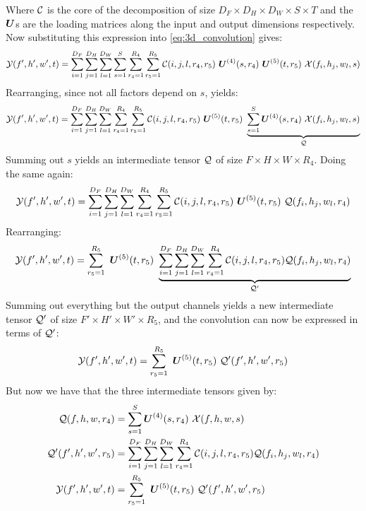 Where $\mathcal{C}$ is the core of the decomposition of size $D_F\times D_H \times D_W \times S \times T$ and the $\boldsymbol{U}$s are the loading matrices along the input and output dimensions respectively. Now substituting this expression into \eqref{eq:3d_convolution} gives:
\begin{equation}
    \tensor{Y}(f', h', w', t) = \sum_{i=1}^{D_F} \sum_{j=1}^{D_H} \sum_{l=1}^{D_W} \sum_{s=1}^{S} \sum_{r_{4}=1}^{R_{4}} \sum_{r_{5}=1}^{R_{5}} \tensor{C}(i, j, l, r_{4}, r_{5}) \ \boldsymbol{U}^{(4)}(s, r_{4}) \  \boldsymbol{U}^{(5)}(t, r_{5}) \ \tensor{X}(f_i, h_j, w_l, s)
\end{equation}
Rearranging, since not all factors depend on $s$, yields:
\begin{equation}
    \mathcal{Y}(f', h', w', t) = \sum_{i=1}^{D_F} \sum_{j=1}^{D_H} \sum_{l=1}^{D_W} \sum_{r_{4}=1}^{R_{4}} \sum_{r_{5}=1}^{R_{5}} \mathcal{C}(i, j, l, r_{4}, r_{5}) \ \boldsymbol{U}^{(5)}(t, r_{5}) \ \underbrace{\sum_{s=1}^{S} \boldsymbol{U}^{(4)}(s, r_{4}) \ \mathcal{X}(f_i, h_j, w_l, s)}_{\large \mathcal{Q}}
\end{equation}
Summing out $s$ yields an intermediate tensor $\mathcal{Q}$ of size $F\times H \times W \times R_4$. Doing the same again:
\begin{equation}
    \mathcal{Y}(f', h', w', t) = \sum_{i=1}^{D_F} \sum_{j=1}^{D_H} \sum_{l=1}^{D_W} \sum_{r_{4}=1}^{R_{4}} \sum_{r_{5}=1}^{R_{5}} \mathcal{C}(i, j, l, r_{4}, r_{5}) \ \boldsymbol{U}^{(5)}(t, r_{5}) \  \mathcal{Q} (f_i, h_j, w_l, r_4)
\end{equation}
Rearranging:
\begin{equation}
    \tensor{Y}(f', h', w', t) = \sum_{r_{5}=1}^{R_{5}} \ \boldsymbol{U}^{(5)}(t, r_{5}) \ \underbrace{\sum_{i=1}^{D_F} \sum_{j=1}^{D_H} \sum_{l=1}^{D_W} \sum_{r_{4}=1}^{R_{4}} \tensor{C}(i, j, l, r_{4}, r_{5})   \tensor{Q} (f_i, h_j, w_l, r_4)}_{\large \tensor{Q}'}
\end{equation}
Summing out everything but the output channels yields a new intermediate tensor $\mathcal{Q}'$ of size $F' \times H' \times W' \times R_5$, and the convolution can now be expressed in terms of $\mathcal{Q}'$:
\begin{equation}
    \tensor{Y}(f', h', w', t) = \sum_{r_{5}=1}^{R_{5}} \ \boldsymbol{U}^{(5)}(t, r_{5}) \ \tensor{Q}'(f', h', w', r_5)
\end{equation}
But now we have that the three intermediate tensors given by:
\begin{align}
    \tensor{Q}(f, h, w, r_4) &= \sum_{s=1}^{S} \boldsymbol{U}^{(4)}(s, r_{4}) \ \tensor{X}(f, h, w, s) \label{eq:Q}\\
    \tensor{Q'}(f', h', w', r_5) &= \sum_{i=1}^{D_F} \sum_{j=1}^{D_H} \sum_{l=1}^{D_W} \sum_{r_{4}=1}^{R_{4}} \tensor{C}(i, j, l, r_{4}, r_{5})   \tensor{Q} (f_i, h_j, w_l, r_4) \label{eq:Q'} \\
    \tensor{Y}(f', h', w', t) &=  \sum_{r_{5}=1}^{R_{5}} \ \boldsymbol{U}^{(5)}(t, r_{5}) \ \tensor{Q}'(f', h', w', r_5) \label{eq:Y}
\end{align}
